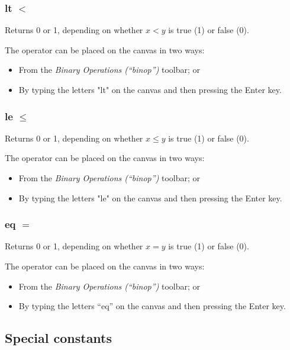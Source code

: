 \subsubsection{lt $<$}


\label{Operation:lt} Returns 0 or 1, depending on whether $x<y$
is true (1) or false (0).

The operator can be placed on the canvas in two ways:
\begin{itemize}
\item From the \emph{Binary Operations (``binop'')} toolbar; or 
\item By typing the letters "lt" on the canvas and then pressing the Enter
key. 
\end{itemize}

\subsubsection{le $\le$}


\label{Operation:le} Returns 0 or 1, depending on whether $x\le y$
is true (1) or false (0).

The operator can be placed on the canvas in two ways:
\begin{itemize}
\item From the \emph{Binary Operations (``binop'')} toolbar; or 
\item By typing the letters "le" on the canvas and then pressing the Enter
key. 
\end{itemize}

\subsubsection{eq $=$}


\label{Operation:eq} Returns 0 or 1, depending on whether $x=y$
is true (1) or false (0).

The operator can be placed on the canvas in two ways:
\begin{itemize}
\item From the \emph{Binary Operations (``binop'')} toolbar; or 
\item By typing the letters ``eq'' on the canvas and then pressing the Enter
key. 
\end{itemize}

\subsection{Special constants}

